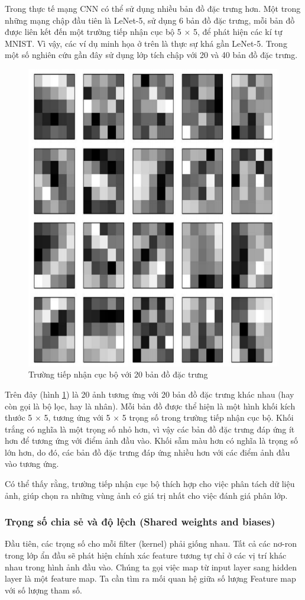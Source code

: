 Trong thực tế mạng CNN có thể sử dụng nhiều bản đồ đặc trưng hơn. Một trong những mạng chập đầu tiên là LeNet-5, sử dụng 6 bản đồ đặc trưng, mỗi bản đồ được liên kết đến một trường tiếp nhận cục bộ 5 × 5, để phát hiện các kí tự MNIST. Vì vậy, các ví dụ minh họa ở trên là thực sự khá gần LeNet-5. Trong một số nghiên cứu gần đây sử dụng lớp tích chập với 20 và 40 bản đồ đặc trưng.
\begin{figure}[H]
	\centering
	\includegraphics[width=0.8\linewidth]{images/20bandodactrung.png}
	\caption{Trường tiếp nhận cục bộ với 20 bản đồ đặc trưng}
	\label{fig:20bandodactrung}
\end{figure}
Trên đây (hình \ref{fig:20bandodactrung}) là 20 ảnh tương ứng với 20 bản đồ đặc trưng khác nhau (hay còn gọi là bộ lọc, hay là nhân). Mỗi bản đồ được thể hiện là một hình khối kích thước 5 × 5, tương ứng với 5 × 5 trọng số trong trường tiếp nhận cục bộ. Khối trắng có nghĩa là một trọng số nhỏ hơn, vì vậy các bản đồ đặc trưng đáp ứng ít hơn để tương ứng với điểm ảnh đầu vào. Khối sẫm màu hơn có nghĩa là trọng số lớn hơn, do đó, các bản đồ đặc trưng đáp ứng nhiều hơn với các điểm ảnh đầu vào tương ứng.

Có thể thấy rằng, trường tiếp nhận cục bộ thích hợp cho việc phân tách dữ liệu ảnh, giúp chọn ra những vùng ảnh có giá trị nhất cho việc đánh giá phân lớp.

\subsubsection{Trọng số chia sẻ và độ lệch (Shared weights and biases)}
Đầu tiên, các trọng số cho mỗi filter (kernel) phải giống nhau. Tất cả các nơ-ron trong lớp ẩn đầu sẽ phát hiện chính xác feature tương tự chỉ ở các vị trí khác nhau trong hình ảnh đầu vào. Chúng ta gọi việc map từ input layer sang hidden layer là một feature map. Ta cần tìm ra mối quan hệ giữa số lượng Feature map với số lượng tham số.

